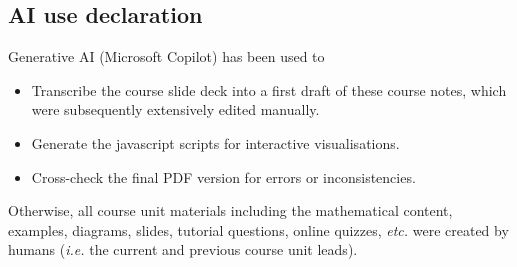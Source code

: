 \subsection{AI use declaration}

Generative AI (Microsoft Copilot) has been used to
\begin{itemize}
    \item Transcribe the course slide deck into a first draft of these course notes, which were subsequently extensively edited manually.
    \item Generate the javascript scripts for interactive visualisations.
    \item Cross-check the final PDF version for errors or inconsistencies.
\end{itemize}
Otherwise, all course unit materials including the mathematical content, examples, diagrams, slides, tutorial questions, online quizzes, \textit{etc.} were created by humans (\textit{i.e.} the current and previous course unit leads).